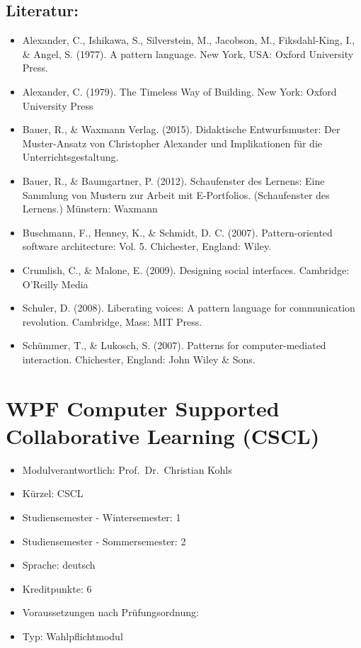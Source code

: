 \section*{Literatur:}\label{literatur-9}

\begin{itemize}
\tightlist
\item
  Alexander, C., Ishikawa, S., Silverstein, M., Jacobson, M.,
  Fiksdahl-King, I., \& Angel, S. (1977). A pattern language. New York,
  USA: Oxford University Press.
\item
  Alexander, C. (1979). The Timeless Way of Building. New York: Oxford
  University Press
\item
  Bauer, R., \& Waxmann Verlag. (2015). Didaktische Entwurfsmuster: Der
  Muster-Ansatz von Christopher Alexander und Implikationen für die
  Unterrichtsgestaltung.
\item
  Bauer, R., \& Baumgartner, P. (2012). Schaufenster des Lernens: Eine
  Sammlung von Mustern zur Arbeit mit E-Portfolios. (Schaufenster des
  Lernens.) Münstern: Waxmann
\item
  Buschmann, F., Henney, K., \& Schmidt, D. C. (2007). Pattern-oriented
  software architecture: Vol. 5. Chichester, England: Wiley.
\item
  Crumlish, C., \& Malone, E. (2009). Designing social interfaces.
  Cambridge: O'Reilly Media
\item
  Schuler, D. (2008). Liberating voices: A pattern language for
  communication revolution. Cambridge, Mass: MIT Press.
\item
  Schümmer, T., \& Lukosch, S. (2007). Patterns for computer-mediated
  interaction. Chichester, England: John Wiley \& Sons.
\end{itemize}

\chapter{WPF Computer Supported Collaborative Learning
(CSCL)}\label{wpf-computer-supported-collaborative-learning-cscl}

\begin{itemize}
\tightlist
\item
  Modulverantwortlich: Prof.~Dr.~Christian Kohls
\item
  Kürzel: CSCL
\item
  Studiensemester - Wintersemester: 1
\item
  Studiensemester - Sommersemester: 2
\item
  Sprache: deutsch
\item
  Kreditpunkte: 6
\item
  Voraussetzungen nach Prüfungsordnung:
\item
  Typ: Wahlpflichtmodul
\end{itemize}

